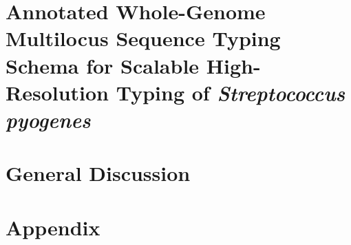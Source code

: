 \documentclass[12pt,a4paper,twoside,openright]{book}
\makeatletter
\def\cleardoublepage{\clearpage\if@twoside \ifodd\c@page\else
    \hbox{}
    \thispagestyle{plain}
    \newpage
    \if@twocolumn\hbox{}\newpage\fi\fi\fi}
\makeatother
\begin{document}
\begin{sloppy}
\chapter{Annotated Whole-Genome Multilocus Sequence Typing Schema for Scalable High-Resolution Typing of \textit{Streptococcus pyogenes}\label{ch:paper3}}
\thispagestyle{empty}
\cleardoublepage


\newpage
\thispagestyle{empty}
\chapter{General Discussion \label{ch:discussion}}
\thispagestyle{empty}
\cleardoublepage


\cleardoublepage
{}
{}
\printbibliography

\newpage
\chapter*{Appendix}
\cleardoublepage



\end{sloppy}
\end{document}
